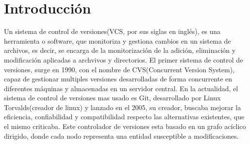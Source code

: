 \chapter{Introducción\label{01intro}}






Un sistema de control de versiones(VCS, por sus siglas en inglés), es una herramienta o software, que monitoriza y gestiona cambios en un sistema de archivos, es decir, se encarga de la monitorización de la adición, eliminación y modificación aplicadas a archvivos y directorios. El primer sistema de control de versiones, surge en 1990, con el nombre de CVS(Concurrent Version System), capaz de gestionar multiples versiones desarrolladas de forma concurrente en diferentes máquinas y almacenadas en un servidor central. En la actualidad, el sistema de control de versiones mas usado es Git, desarrollado por Linux Torvalds(creador de linux) y lanzado en el 2005,  su creador, buscaba mejorar la eficiencia, confiabilidad y compatibilidad respecto las alternativas existentes, que el mismo criticaba. Este controlador de versiones esta basado en un grafo acíclico dirigido, donde cada nodo representa una entidad susceptible a modificaciones.

